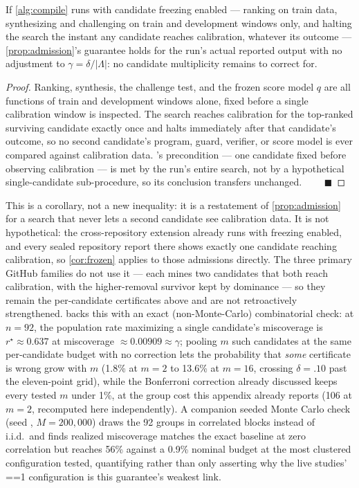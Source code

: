 \begin{corollary}
\label{cor:frozen}
If \cref{alg:compile} runs with candidate freezing enabled --- ranking on train
data, synthesizing and challenging on train and development windows only, and
halting the search the instant any candidate reaches calibration, whatever its
outcome --- \cref{prop:admission}'s guarantee holds for the run's actual
reported output with no adjustment to $\gamma=\delta/|\Lambda|$: no candidate
multiplicity remains to correct for.
\end{corollary}
\begin{proof}
Ranking, synthesis, the challenge test, and the frozen score model $q$ are all
functions of train and development windows alone, fixed before a single
calibration window is inspected. The search reaches calibration for the
top-ranked surviving candidate exactly once and halts immediately after that
candidate's outcome, so no second candidate's program, guard, verifier, or
score model is ever compared against calibration data.
's precondition --- one candidate fixed before observing
calibration --- is met by the run's entire search, not by a hypothetical
single-candidate sub-procedure, so its conclusion transfers unchanged.
$\qquad\blacksquare$
\end{proof}
This is a corollary, not a new inequality: it is a restatement of
\cref{prop:admission} for a search that never lets a second candidate see
calibration data. It is not hypothetical: the cross-repository extension
already runs with freezing enabled, and every sealed repository report there
shows exactly one candidate reaching calibration, so \cref{cor:frozen} applies
to those admissions directly. The three primary GitHub families do not use it
--- each mines two candidates that both reach calibration, with the
higher-removal survivor kept by dominance --- so they remain the per-candidate
certificates above and are not retroactively strengthened.
 backs this with
an exact (non-Monte-Carlo) combinatorial check: at $n=92$, the population rate
maximizing a single candidate's miscoverage is $r^\star\!\approx\!0.637$ at
miscoverage $\approx\!0.00909\!\approx\!\gamma$; pooling $m$ such candidates at
the same per-candidate budget with no correction lets the probability that
\emph{some} certificate is wrong grow with $m$ (1.8\% at $m=2$ to 13.6\% at
$m=16$, crossing $\delta=.10$ past the eleven-point grid), while the
Bonferroni correction already discussed keeps every tested $m$ under 1\%, at
the group cost this appendix already reports (106 at $m=2$, recomputed here
independently). A companion seeded Monte Carlo check (seed ,
$M{=}200{,}000$) draws the 92 groups in correlated blocks instead of i.i.d.\ and
finds realized miscoverage matches the exact baseline at zero correlation but
reaches 56\% against a 0.9\% nominal budget at the most clustered
configuration tested, quantifying rather than only asserting why the live
studies' ==1 configuration is this
guarantee's weakest link.

